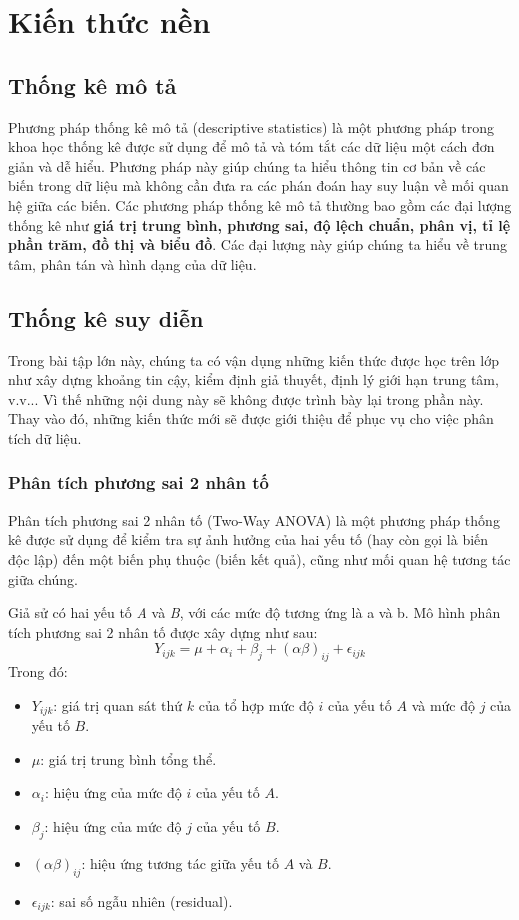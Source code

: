\section{Kiến thức nền}\label{Kien thuc nen}
\subsection{Thống kê mô tả}
Phương pháp thống kê mô tả (descriptive statistics) là một phương pháp trong khoa học thống kê được sử dụng để mô tả và tóm tắt các dữ liệu một cách đơn giản và dễ hiểu. Phương pháp này giúp chúng ta hiểu thông tin cơ bản về các biến trong dữ liệu mà không cần đưa ra các phán đoán hay suy luận về mối quan hệ giữa các biến. Các phương pháp thống kê mô tả thường bao gồm các đại lượng thống kê như \textbf{giá trị trung bình, phương sai, độ lệch chuẩn, phân vị, tỉ lệ phần trăm, đồ thị và biểu đồ}. Các đại lượng này giúp chúng ta hiểu về trung tâm, phân tán và hình dạng của dữ liệu.
\subsection{Thống kê suy diễn}
Trong bài tập lớn này, chúng ta có vận dụng những kiến thức được học trên lớp như xây dựng khoảng tin cậy, kiểm định giả thuyết, định lý giới hạn trung tâm, v.v... Vì thế những nội dung này sẽ không được trình bày lại trong phần này. Thay vào đó, những kiến thức mới sẽ được giới thiệu để phục vụ cho việc phân tích dữ liệu.
\subsubsection{Phân tích phương sai 2 nhân tố}
Phân tích phương sai 2 nhân tố (Two-Way ANOVA) là một phương pháp thống kê được sử dụng để kiểm tra sự ảnh hưởng của hai yếu tố (hay còn gọi là biến độc lập) đến một biến phụ thuộc (biến kết quả), cũng như mối quan hệ tương tác giữa chúng.

Giả sử có hai yếu tố \textit{A} và \textit{B}, với các mức độ tương ứng là a và b. Mô hình phân tích phương sai 2 nhân tố được xây dựng như sau:
\[
Y_{ijk} = \mu + \alpha_i + \beta_j + (\alpha \beta)_{ij} + \epsilon_{ijk}
\]
Trong đó:
\begin{itemize}
  \item \( Y_{ijk} \): giá trị quan sát thứ \( k \) của tổ hợp mức độ \( i \) của yếu tố \( A \) và mức độ \( j \) của yếu tố \( B \).
  \item \( \mu \): giá trị trung bình tổng thể.
  \item \( \alpha_i \): hiệu ứng của mức độ \( i \) của yếu tố \( A \).
  \item \( \beta_j \): hiệu ứng của mức độ \( j \) của yếu tố \( B \).
  \item \( (\alpha\beta)_{ij} \): hiệu ứng tương tác giữa yếu tố \( A \) và \( B \).
  \item \( \epsilon_{ijk} \): sai số ngẫu nhiên (residual).
\end{itemize}
